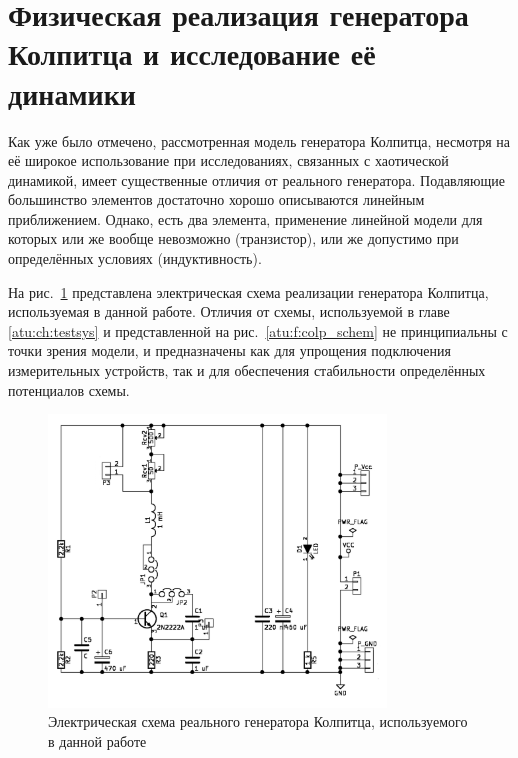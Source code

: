 




\section{Физическая реализация генератора Колпитца и исследование её динамики} %


Как уже было отмечено,
рассмотренная  модель
генератора Колпитца, несмотря на её широкое использование
при исследованиях, связанных с хаотической динамикой,
имеет существенные отличия от реального генератора.
Подавляющие большинство элементов достаточно хорошо описываются линейным
приближением. Однако, есть два элемента,
применение линейной модели для которых или же вообще невозможно (транзистор),
или же допустимо при определённых условиях (индуктивность).




На рис.~\ref{atu:f:colp_schem_real} представлена электрическая схема
реализации генератора Колпитца, используемая в данной работе.
Отличия от схемы, используемой в главе \ref{atu:ch:testsys}
и представленной на рис.~\ref{atu:f:colp_schem}
не принципиальны с точки зрения модели,
и предназначены как для упрощения подключения
измерительных устройств, так и для
обеспечения стабильности определённых потенциалов схемы.

\begin{figure}[htb!]
\centerline{\includegraphics[width=0.8\textwidth]{p/colp_schem_real.png} }
\caption{Электрическая схема реального генератора Колпитца, используемого в данной работе}
\label{atu:f:colp_schem_real}
\end{figure}


